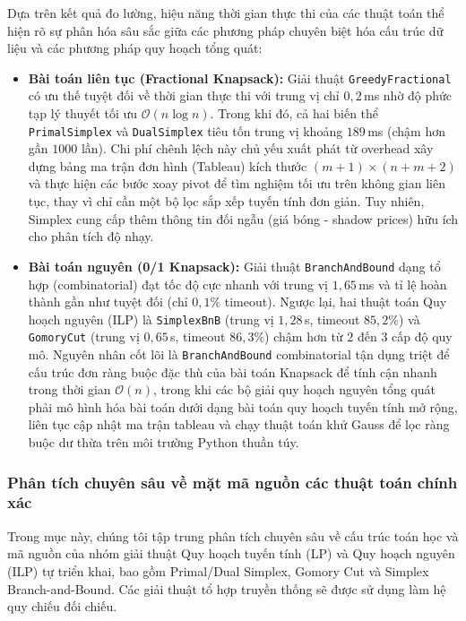 \documentclass[fontsize=13pt,a4paper]{report}
\begin{document}
Dựa trên kết quả đo lường, hiệu năng thời gian thực thi của các thuật toán thể hiện rõ sự phân hóa sâu sắc giữa các phương pháp chuyên biệt hóa cấu trúc dữ liệu và các phương pháp quy hoạch tổng quát:
\begin{itemize}[leftmargin=*]
    \item \textbf{Bài toán liên tục (Fractional Knapsack):} Giải thuật \texttt{GreedyFractional} có ưu thế tuyệt đối về thời gian thực thi với trung vị chỉ $0,2$\,ms nhờ độ phức tạp lý thuyết tối ưu $\mathcal{O}(n \log n)$. Trong khi đó, cả hai biến thể \texttt{PrimalSimplex} và \texttt{DualSimplex} tiêu tốn trung vị khoảng $189$\,ms (chậm hơn gần $1000$ lần). Chi phí chênh lệch này chủ yếu xuất phát từ overhead xây dựng bảng ma trận đơn hình (Tableau) kích thước $(m+1) \times (n+m+2)$ và thực hiện các bước xoay pivot để tìm nghiệm tối ưu trên không gian liên tục, thay vì chỉ cần một bộ lọc sắp xếp tuyến tính đơn giản. Tuy nhiên, Simplex cung cấp thêm thông tin đối ngẫu (giá bóng - shadow prices) hữu ích cho phân tích độ nhạy.
    \item \textbf{Bài toán nguyên (0/1 Knapsack):} Giải thuật \texttt{BranchAndBound} dạng tổ hợp (combinatorial) đạt tốc độ cực nhanh với trung vị $1,65$\,ms và tỉ lệ hoàn thành gần như tuyệt đối (chỉ $0,1\%$ timeout). Ngược lại, hai thuật toán Quy hoạch nguyên (ILP) là \texttt{SimplexBnB} (trung vị $1,28$\,s, timeout $85,2\%$) và \texttt{GomoryCut} (trung vị $0,65$\,s, timeout $86,3\%$) chậm hơn từ $2$ đến $3$ cấp độ quy mô. Nguyên nhân cốt lõi là \texttt{BranchAndBound} combinatorial tận dụng triệt để cấu trúc đơn ràng buộc đặc thù của bài toán Knapsack để tính cận nhanh trong thời gian $\mathcal{O}(n)$, trong khi các bộ giải quy hoạch nguyên tổng quát phải mô hình hóa bài toán dưới dạng bài toán quy hoạch tuyến tính mở rộng, liên tục cập nhật ma trận tableau và chạy thuật toán khử Gauss để lọc ràng buộc dư thừa trên môi trường Python thuần túy.
\end{itemize}

\subsubsection{Phân tích chuyên sâu về mặt mã nguồn các thuật toán chính xác}
\label{subsubsec:deep_source_analysis}

Trong mục này, chúng tôi tập trung phân tích chuyên sâu về cấu trúc toán học và mã nguồn của nhóm giải thuật Quy hoạch tuyến tính (LP) và Quy hoạch nguyên (ILP) tự triển khai, bao gồm Primal/Dual Simplex, Gomory Cut và Simplex Branch-and-Bound. Các giải thuật tổ hợp truyền thống sẽ được sử dụng làm hệ quy chiếu đối chiếu.
\end{document}
